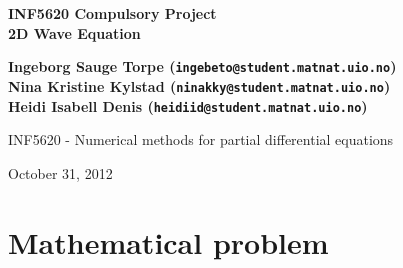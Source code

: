 \documentclass[twoside]{article}
\begin{document}






\begin{center}
{\LARGE\bf INF5620 Compulsory Project}\\
{\LARGE\bf 2D Wave Equation}
\end{center}





\begin{center}
{\bf Ingeborg Sauge Torpe (\texttt{ingebeto@student.matnat.uio.no})} \\ [0mm]
{\bf Nina Kristine Kylstad (\texttt{ninakky@student.matnat.uio.no})} \\ [0mm]
{\bf Heidi Isabell Denis (\texttt{heidiid@student.matnat.uio.no})} \\ [0mm]
\end{center}

\begin{center}
\centerline{INF5620 - Numerical methods for partial differential equations}
\end{center}





\begin{center}
October 31, 2012
\end{center}

\vspace{1cm}



\begin{abstract}
This report investigates the two dimensional wave equation with variable coefficients.



\end{abstract}

\tableofcontents





\section{Mathematical problem}
\end{document}
